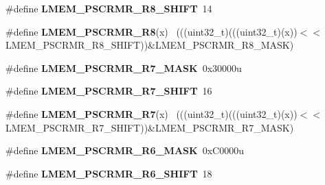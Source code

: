 \begin{DoxyCompactItemize}
\item 
\hypertarget{group___l_m_e_m___register___masks_gabdcab1e873bf52615e8f637c810f0b17}{}\#define {\bfseries L\+M\+E\+M\+\_\+\+P\+S\+C\+R\+M\+R\+\_\+\+R8\+\_\+\+S\+H\+I\+F\+T}~14\label{group___l_m_e_m___register___masks_gabdcab1e873bf52615e8f637c810f0b17}

\item 
\hypertarget{group___l_m_e_m___register___masks_ga9006ba728896458850bdad5cbdb72a7e}{}\#define {\bfseries L\+M\+E\+M\+\_\+\+P\+S\+C\+R\+M\+R\+\_\+\+R8}(x)                                            ~(((uint32\+\_\+t)(((uint32\+\_\+t)(x))$<$$<$L\+M\+E\+M\+\_\+\+P\+S\+C\+R\+M\+R\+\_\+\+R8\+\_\+\+S\+H\+I\+F\+T))\&L\+M\+E\+M\+\_\+\+P\+S\+C\+R\+M\+R\+\_\+\+R8\+\_\+\+M\+A\+S\+K)\label{group___l_m_e_m___register___masks_ga9006ba728896458850bdad5cbdb72a7e}

\item 
\hypertarget{group___l_m_e_m___register___masks_gad7cd248a198a5142a805ccf74df4394b}{}\#define {\bfseries L\+M\+E\+M\+\_\+\+P\+S\+C\+R\+M\+R\+\_\+\+R7\+\_\+\+M\+A\+S\+K}~0x30000u\label{group___l_m_e_m___register___masks_gad7cd248a198a5142a805ccf74df4394b}

\item 
\hypertarget{group___l_m_e_m___register___masks_gadb91fc2d85c8e31c835270ea80cf7b61}{}\#define {\bfseries L\+M\+E\+M\+\_\+\+P\+S\+C\+R\+M\+R\+\_\+\+R7\+\_\+\+S\+H\+I\+F\+T}~16\label{group___l_m_e_m___register___masks_gadb91fc2d85c8e31c835270ea80cf7b61}

\item 
\hypertarget{group___l_m_e_m___register___masks_gae4bf6265491becfc3b9ee16b5991528f}{}\#define {\bfseries L\+M\+E\+M\+\_\+\+P\+S\+C\+R\+M\+R\+\_\+\+R7}(x)                                            ~(((uint32\+\_\+t)(((uint32\+\_\+t)(x))$<$$<$L\+M\+E\+M\+\_\+\+P\+S\+C\+R\+M\+R\+\_\+\+R7\+\_\+\+S\+H\+I\+F\+T))\&L\+M\+E\+M\+\_\+\+P\+S\+C\+R\+M\+R\+\_\+\+R7\+\_\+\+M\+A\+S\+K)\label{group___l_m_e_m___register___masks_gae4bf6265491becfc3b9ee16b5991528f}

\item 
\hypertarget{group___l_m_e_m___register___masks_gad79d3d5fe06e1f29be1ccfdc4351f87e}{}\#define {\bfseries L\+M\+E\+M\+\_\+\+P\+S\+C\+R\+M\+R\+\_\+\+R6\+\_\+\+M\+A\+S\+K}~0x\+C0000u\label{group___l_m_e_m___register___masks_gad79d3d5fe06e1f29be1ccfdc4351f87e}

\item 
\hypertarget{group___l_m_e_m___register___masks_ga790dd5889017a60c7c0da11823f482a7}{}\#define {\bfseries L\+M\+E\+M\+\_\+\+P\+S\+C\+R\+M\+R\+\_\+\+R6\+\_\+\+S\+H\+I\+F\+T}~18\label{group___l_m_e_m___register___masks_ga790dd5889017a60c7c0da11823f482a7}


\end{DoxyCompactItemize}
